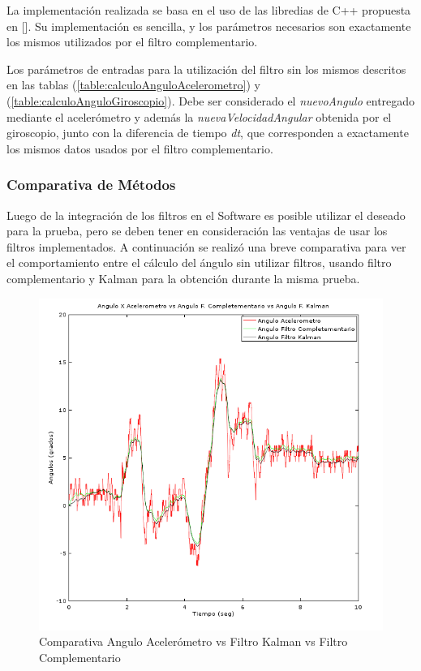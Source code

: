 \documentclass[12pt,a4paper]{article}
\begin{document}
La implementación realizada se basa en el uso de las libredias de C++ propuesta en [\cite{kalmanTKJ}]. Su implementación es sencilla, y los parámetros necesarios son exactamente los mismos utilizados por el filtro complementario.

Los parámetros de entradas para la utilización del filtro sin los mismos descritos en las tablas (\ref{table:calculoAnguloAcelerometro}) y (\ref{table:calculoAnguloGiroscopio}).
Debe ser considerado el \textit{nuevoAngulo} entregado mediante el acelerómetro y además la \textit{nuevaVelocidadAngular} obtenida por el giroscopio, junto con la diferencia de tiempo \textit{dt}, que corresponden a exactamente los mismos datos usados por el filtro complementario.


\subsubsection{Comparativa de Métodos}
Luego de la integración de los filtros en el Software es posible utilizar el deseado para la prueba, pero se deben tener en consideración las ventajas de usar los filtros implementados. A continuación se realizó una breve comparativa para ver el comportamiento entre el cálculo del ángulo sin utilizar filtros, usando filtro complementario y Kalman para la obtención durante la misma prueba.

\begin{figure}[H]
	\centering
	\includegraphics[scale=0.75]{images/angKalCom}
	\caption{Comparativa Angulo Acelerómetro vs Filtro Kalman vs Filtro Complementario}
	\label{fig:AnguloXvsFiltros}
\end{figure}
\end{document}
